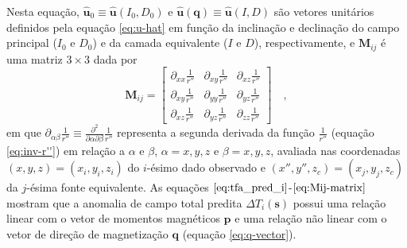 Nesta equação, $\hat{\mathbf{u}}_{0} \equiv \hat{\mathbf{u}}(I_{0}, D_{0})$ e 
$\hat{\mathbf{u}}(\mathbf{q}) \equiv \hat{\mathbf{u}}(I, D)$ são vetores unitários
definidos pela equação \ref{eq:u-hat} em função da inclinação e declinação do 
campo principal ($I_{0}$ e $D_{0}$) e da camada equivalente ($I$ e $D$),
respectivamente, e $\mathbf{M}_{ij}$ é uma matriz $3 \times 3$ dada por 
\begin{equation}
\mathbf{M}_{ij} = \begin{bmatrix}
\partial_{xx} \frac{1}{r''} & 
\partial_{xy} \frac{1}{r''} &
\partial_{xz} \frac{1}{r''} \\
\partial_{xy} \frac{1}{r''} & 
\partial_{yy} \frac{1}{r''} &
\partial_{yz} \frac{1}{r''} \\
\partial_{xz} \frac{1}{r''} & 
\partial_{yz} \frac{1}{r''} &
\partial_{zz} \frac{1}{r''}
\end{bmatrix} \quad ,
\label{eq:Mij-matrix}
\end{equation}
em que $\partial_{\alpha\beta} \frac{1}{r''} \equiv \frac{\partial^{2}}{\partial \alpha \partial \beta} \frac{1}{r''}$ 
representa a segunda derivada da função $\frac{1}{r''}$ (equação \ref{eq:inv-r''}) em relação a $\alpha$ e $\beta$, 
$\alpha = x, y, z$ e $\beta = x, y, z$, avaliada nas coordenadas $(x, y, z) = (x_{i}, y_{i}, z_{i})$ do $i$-ésimo dado  
observado e $(x'', y'', z_{c}) = (x_{j}, y_{j}, z_{c})$ da $j$-ésima fonte equivalente.
As equações $\ref{eq:tfa_pred_i}$-$\ref{eq:Mij-matrix}$ mostram que a anomalia de campo total predita 
$\Delta T_{i}(\mathbf{s})$ possui uma relação linear com o vetor de momentos magnéticos $\mathbf{p}$ e uma 
relação não linear com o vetor de direção de magnetização $\mathbf{q}$ (equação \ref{eq:q-vector}).



